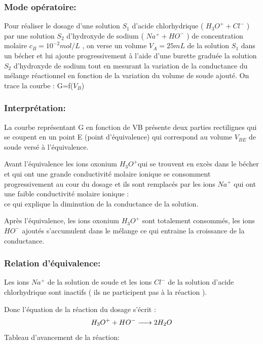 \documentclass[12pt]{article}
\begin{document}
  \subsubsection{Mode opératoire:}
Pour réaliser le dosage d'une solution $S_1$ d'acide chlorhydrique ( $H_3O^+ + Cl^-$ ) par une solution $S_2$ d'hydroxyde de sodium
( $Na^+ + HO^-$ ) de concentration molaire $c_B=10^{-2} mol/L$ , on verse un volume $V_A=25mL$ de la solution $S_1$ dans un bécher et lui ajoute progressivement à l'aide d'une burette graduée la solution $S_2$ d'hydroxyde de sodium tout en mesurant la
variation de la conductance du mélange réactionnel en fonction de la variation du volume de soude ajouté.
On trace la courbe : G=f($V_B$)
  \subsubsection{Interprétation:}
  La courbe représentant G en fonction de VB présente deux parties rectilignes qui se coupent en un point E (point d'équivalence) qui correspond au volume $V_{BE}$ de soude versé à l'équivalence.

  Avant l'équivalence les ions oxonium $H_3O^+$qui se trouvent en excès dans le bécher et qui ont une grande conductivité molaire ionique se consomment progressivement au cour du dosage et ils sont remplacés par les ions $Na^+$ qui ont une faible conductivité molaire ionique :
\\ce qui explique la diminution de la conductance de la solution.

  Après l'équivalence, les ions oxonium $H_3O^+$ sont totalement consommés, les ions $HO^-$ ajoutés s'accumulent dans le mélange ce qui entraine la croissance de la conductance.
\subsubsection{Relation d'équivalence:}
Les ions $Na^+$ de la solution de soude et les ions $Cl^-$ de la solution d'acide chlorhydrique sont inactifs ( ils ne participent pas à la réaction ).

Donc l'équation de la réaction du dosage s'écrit :
$$\ce{$H_3O^+$ + $HO^-$ -> $2H_2O$}$$
Tableau d'avancement de la réaction:
\end{document}
